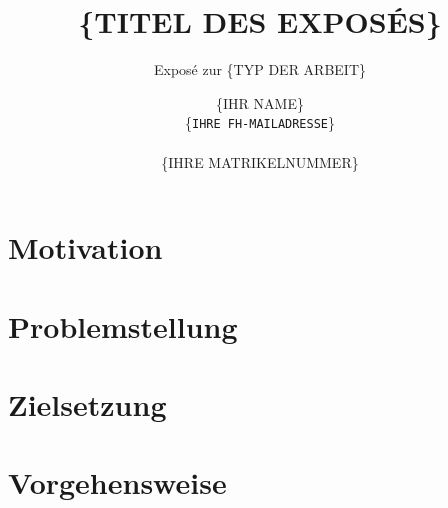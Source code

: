 \documentclass[fontsize=11pt, paper=a4, parskip=half]{scrartcl}
\title{
	\{TITEL DES EXPOSÉS\}
}
\subtitle{Exposé zur 
	\{TYP DER ARBEIT\}
}
\author{
	\{IHR NAME\}
	\\
	\{\texttt{IHRE FH-MAILADRESSE}\}
	\\ \\
	{\{IHRE MATRIKELNUMMER\}}
}
\begin{document}
\maketitle

\section{Motivation}
\lipsum[1] \cite{Brown2012}

\section{Problemstellung}
\lipsum[2] \cite{Erl2005}

\section{Zielsetzung}
\lipsum[3] \cite{Pautasso2008}

\section{Vorgehensweise}
\lipsum[4-5]

\pagebreak



\end{document}

